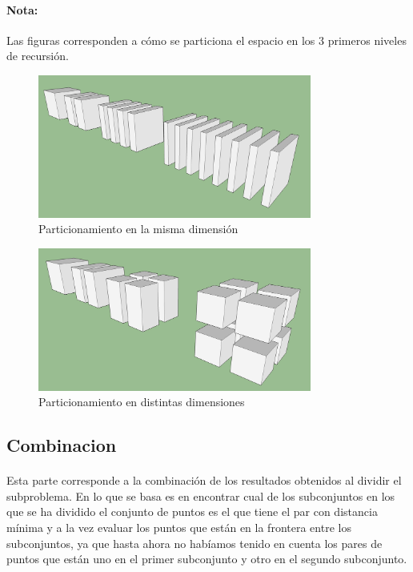 \documentclass{article}
\begin{document}
		\paragraph{Nota:}
		Las figuras corresponden a cómo se particiona el espacio en los 3 primeros niveles de recursión.



	\begin{figure}[H]
		\centering
		\includegraphics[width=90mm]{cube_division_1.jpg}
		\caption{Particionamiento en la misma dimensión \label{same_dim}}
	\end{figure}

	\begin{figure}[H]
		\centering
		\includegraphics[width=90mm]{cube_division_2.jpg}
		\caption{Particionamiento en distintas dimensiones \label{different_dim}}
	\end{figure}


	\subsection{Combinacion}
		\paragraph{}
		Esta parte corresponde a la combinación de los resultados obtenidos al dividir el subproblema. En lo que se basa es en encontrar cual de los subconjuntos en los que se ha dividido el conjunto de puntos es el que tiene el par con distancia mínima y a la vez evaluar los puntos que están en la frontera entre los subconjuntos, ya que hasta ahora no habíamos tenido en cuenta los pares de puntos que están uno en el primer subconjunto y otro en el segundo subconjunto.
		
\end{document}
